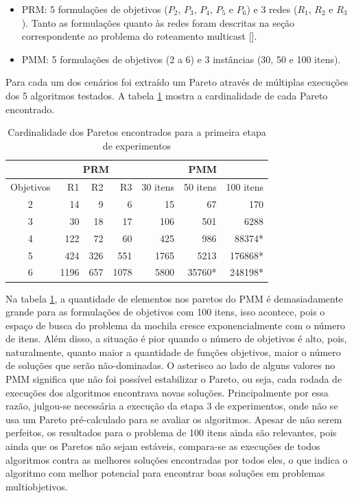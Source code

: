 \begin{itemize}
	\item PRM: 5 formulações de objetivos ($P_2$, $P_3$, $P_4$, $P_5$ e $P_6$) e 3 redes ($R_1$, $R_2$ e $R_3$). Tanto as formulações quanto às redes foram descritas na seção correspondente ao problema do roteamento multicast [].
	\item PMM: 5 formulações de objetivos (2 a 6) e 3 instâncias (30, 50 e 100 itens).
\end{itemize}

Para cada um dos cenários foi extraído um Pareto através de múltiplas execuções dos 5 algoritmos testados. A tabela \ref{table_exp1_paretos} mostra a cardinalidade de cada Pareto encontrado.

\begin{table}[!htbp]
	\centering
	\caption{Cardinalidade dos Paretos encontrados para a primeira etapa de experimentos}
	\label{table_exp1_paretos}
	\begin{tabular}{c|rrr|rrr}
		& \multicolumn{3}{c|}{\textbf{PRM}} & \multicolumn{3}{c}{\textbf{PMM}} \\ \hline
		Objetivos & R1         & R2       & R3        & 30 itens  & 50 itens & 100 itens \\ \hline
		2         & 14         & 9        & 6         & 15        & 67       & 170       \\
		3         & 30         & 18       & 17        & 106       & 501      & 6288      \\
		4         & 122        & 72       & 60        & 425       & 986      & 88374*    \\
		5         & 424        & 326      & 551       & 1765      & 5213     & 176868*   \\
		6         & 1196       & 657      & 1078      & 5800      & 35760*   & 248198*   \\ \hline
	\end{tabular}
\end{table}

Na tabela \ref{table_exp1_paretos}, a quantidade de elementos nos paretos do PMM é demasiadamente grande para as formulações de objetivos com 100 itens, isso acontece, pois o espaço de busca do problema da mochila cresce exponencialmente com o número de itens. Além disso, a situação é pior quando o número de objetivos é alto, pois, naturalmente, quanto maior a quantidade de funções objetivos, maior o número de soluções que serão não-dominadas. O asterisco ao lado de alguns valores no PMM significa que não foi possível estabilizar o Pareto, ou seja, cada rodada de execuções dos algoritmos encontrava novas soluções. Principalmente por essa razão, julgou-se necessária a execução da etapa 3 de experimentos, onde não se usa um Pareto pré-calculado para se avaliar os algoritmos. Apesar de não serem perfeitos, os resultados para o problema de 100 itens ainda são relevantes, pois ainda que os Paretos não sejam estáveis, compara-se as execuções de todos algoritmos contra as melhores soluções encontradas por todos eles, o que indica o algoritmo com melhor potencial para encontrar boas soluções em problemas multiobjetivos.

